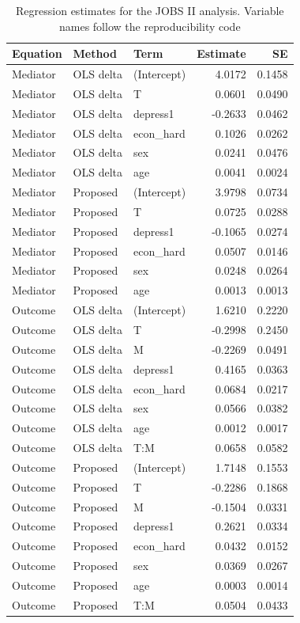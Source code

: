\begin{table}[htbp]
\centering
\caption{Regression estimates for the JOBS II analysis. Variable names follow the reproducibility code}
\label{tab:application_regression}
\footnotesize
\begin{tabular}{lllrr}
\toprule
Equation & Method & Term & Estimate & SE \\
\midrule
Mediator & OLS delta & (Intercept) & 4.0172 & 0.1458 \\
Mediator & OLS delta & T & 0.0601 & 0.0490 \\
Mediator & OLS delta & depress1 & -0.2633 & 0.0462 \\
Mediator & OLS delta & econ\_hard & 0.1026 & 0.0262 \\
Mediator & OLS delta & sex & 0.0241 & 0.0476 \\
Mediator & OLS delta & age & 0.0041 & 0.0024 \\
Mediator & Proposed & (Intercept) & 3.9798 & 0.0734 \\
Mediator & Proposed & T & 0.0725 & 0.0288 \\
Mediator & Proposed & depress1 & -0.1065 & 0.0274 \\
Mediator & Proposed & econ\_hard & 0.0507 & 0.0146 \\
Mediator & Proposed & sex & 0.0248 & 0.0264 \\
Mediator & Proposed & age & 0.0013 & 0.0013 \\
Outcome & OLS delta & (Intercept) & 1.6210 & 0.2220 \\
Outcome & OLS delta & T & -0.2998 & 0.2450 \\
Outcome & OLS delta & M & -0.2269 & 0.0491 \\
Outcome & OLS delta & depress1 & 0.4165 & 0.0363 \\
Outcome & OLS delta & econ\_hard & 0.0684 & 0.0217 \\
Outcome & OLS delta & sex & 0.0566 & 0.0382 \\
Outcome & OLS delta & age & 0.0012 & 0.0017 \\
Outcome & OLS delta & T:M & 0.0658 & 0.0582 \\
Outcome & Proposed & (Intercept) & 1.7148 & 0.1553 \\
Outcome & Proposed & T & -0.2286 & 0.1868 \\
Outcome & Proposed & M & -0.1504 & 0.0331 \\
Outcome & Proposed & depress1 & 0.2621 & 0.0334 \\
Outcome & Proposed & econ\_hard & 0.0432 & 0.0152 \\
Outcome & Proposed & sex & 0.0369 & 0.0267 \\
Outcome & Proposed & age & 0.0003 & 0.0014 \\
Outcome & Proposed & T:M & 0.0504 & 0.0433 \\
\bottomrule
\end{tabular}
\end{table}
